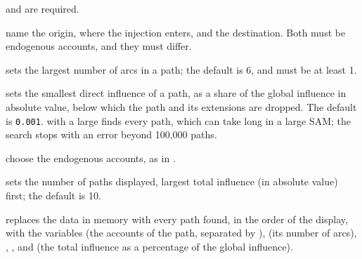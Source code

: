  and  are required.


\begin{optdesc}
\item[\optarg{}{from}{account} \textrm{and} \optarg{}{to}{account}] name the
origin, where the injection enters, and the destination. Both must be
endogenous accounts, and they must differ.

\item[\optarg{max}{length}{\#}] sets the largest number of arcs in a path; the
default is 6, and \argu{\#} must be at least 1.

\item[\optarg{thr}{eshold}{\#}] sets the smallest direct influence of a path,
as a share of the global influence in absolute value, below which the path and
its extensions are dropped. The default is \texttt{0.001}. 
with a large  finds every path, which can take long in a
large SAM; the search stops with an error beyond 100,000 paths.

\item[\optarg{endo}{genous}{accounts} \textrm{and}
\optarg{exo}{genous}{accounts}] choose the endogenous accounts, as in
.

\item[\optarg{}{top}{\#}] sets the number of paths displayed, largest total
influence (in absolute value) first; the default is 10.

\item[\opt{}{clear}] replaces the data in memory with every path found, in the
order of the display, with the variables  (the accounts of the path,
separated by \cmd{ > }),  (its number of arcs), ,
,  and  (the total influence as a
percentage of the global influence).
\end{optdesc}


